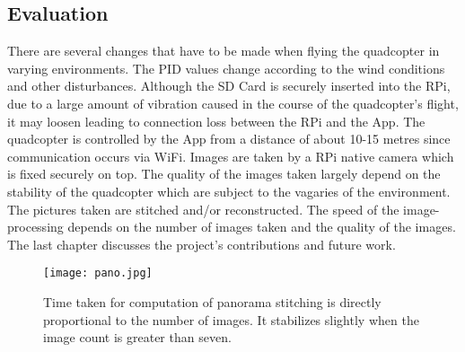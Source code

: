 \subsection{Evaluation}
There are several changes that have to be made when flying the quadcopter in varying environments. The PID values change according to the wind conditions and other disturbances. Although the SD Card is securely inserted into the RPi, due to a large amount of vibration caused in the course of the quadcopter's flight, it may loosen leading to connection loss between the RPi and the App. 
\newline
\newline
The quadcopter is controlled by the App from a distance of about 10-15 metres since communication occurs via WiFi. Images are taken by a RPi native camera which is fixed securely on top. The quality of the images taken largely depend on the stability of the quadcopter which are subject to the vagaries of the environment.
The pictures taken are stitched and/or reconstructed. The speed of the image-processing depends on the number of images taken and the quality of the images. 
\newline
The last chapter discusses the project's contributions and future work.
\begin{figure}[H]
  \centering
  \texttt{[image: pano.jpg]}
  \caption{Time taken for computation of panorama stitching is directly proportional to the number of images. It stabilizes slightly when the image count is greater than seven.}
  \label{panorama stitching time graph}	
\end{figure}

